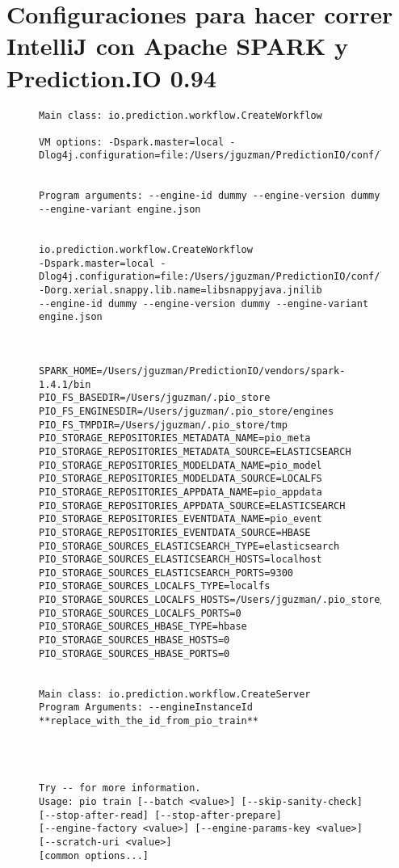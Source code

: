 \newpage
\section{Configuraciones para hacer correr IntelliJ con Apache SPARK y Prediction.IO 0.94}



\begin{figure}[t]%
	\centering
	
	
\begin{lstlisting}[frame=single,basicstyle=\ttfamily\tiny,]
Main class: io.prediction.workflow.CreateWorkflow

VM options: -Dspark.master=local -Dlog4j.configuration=file:/Users/jguzman/PredictionIO/conf/log4j.properties


Program arguments: --engine-id dummy --engine-version dummy --engine-variant engine.json


io.prediction.workflow.CreateWorkflow
-Dspark.master=local -Dlog4j.configuration=file:/Users/jguzman/PredictionIO/conf/log4j.properties -Dorg.xerial.snappy.lib.name=libsnappyjava.jnilib 
--engine-id dummy --engine-version dummy --engine-variant engine.json



SPARK_HOME=/Users/jguzman/PredictionIO/vendors/spark-1.4.1/bin
PIO_FS_BASEDIR=/Users/jguzman/.pio_store
PIO_FS_ENGINESDIR=/Users/jguzman/.pio_store/engines
PIO_FS_TMPDIR=/Users/jguzman/.pio_store/tmp
PIO_STORAGE_REPOSITORIES_METADATA_NAME=pio_meta
PIO_STORAGE_REPOSITORIES_METADATA_SOURCE=ELASTICSEARCH
PIO_STORAGE_REPOSITORIES_MODELDATA_NAME=pio_model
PIO_STORAGE_REPOSITORIES_MODELDATA_SOURCE=LOCALFS
PIO_STORAGE_REPOSITORIES_APPDATA_NAME=pio_appdata
PIO_STORAGE_REPOSITORIES_APPDATA_SOURCE=ELASTICSEARCH
PIO_STORAGE_REPOSITORIES_EVENTDATA_NAME=pio_event
PIO_STORAGE_REPOSITORIES_EVENTDATA_SOURCE=HBASE
PIO_STORAGE_SOURCES_ELASTICSEARCH_TYPE=elasticsearch
PIO_STORAGE_SOURCES_ELASTICSEARCH_HOSTS=localhost
PIO_STORAGE_SOURCES_ELASTICSEARCH_PORTS=9300
PIO_STORAGE_SOURCES_LOCALFS_TYPE=localfs
PIO_STORAGE_SOURCES_LOCALFS_HOSTS=/Users/jguzman/.pio_store/models
PIO_STORAGE_SOURCES_LOCALFS_PORTS=0
PIO_STORAGE_SOURCES_HBASE_TYPE=hbase
PIO_STORAGE_SOURCES_HBASE_HOSTS=0
PIO_STORAGE_SOURCES_HBASE_PORTS=0


Main class: io.prediction.workflow.CreateServer
Program Arguments: --engineInstanceId **replace_with_the_id_from_pio_train**




Try -- for more information.
Usage: pio train [--batch <value>] [--skip-sanity-check]
[--stop-after-read] [--stop-after-prepare]
[--engine-factory <value>] [--engine-params-key <value>]
[--scratch-uri <value>]
[common options...]


\end{lstlisting}
\end{figure}
